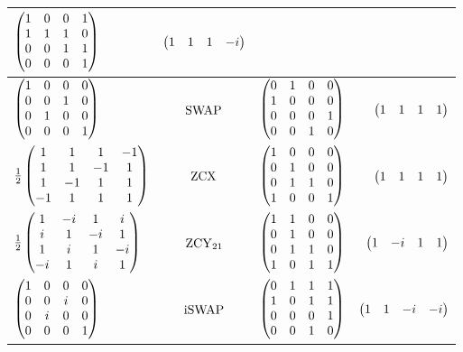 \documentclass[a4paper,english]{scrartcl}
\begin{document}
\begin{proposition}
\begin{table}[H]
\begin{tabular}{lccr}
  $\begin{pmatrix}1&0&0&1\\1&1&1&0\\0&0&1&1\\0&0&0&1\end{pmatrix}$ & $\begin{pmatrix}1&1&1&-i\end{pmatrix}$\\
  \midrule
  $\begin{pmatrix}1&0&0&0\\0&0&1&0\\0&1&0&0\\0&0&0&1\end{pmatrix}$ & $\Swap$ &
  $\begin{pmatrix}0&1&0&0\\1&0&0&0\\0&0&0&1\\0&0&1&0\end{pmatrix}$ & $\begin{pmatrix}1&1&1&1\end{pmatrix}$\\
  \midrule
  $\frac{1}{2}\begin{pmatrix}1&1&1&-1\\1&1&-1&1\\1&-1&1&1\\-1&1&1&1\end{pmatrix}$ & $\zcx$ &
  $\begin{pmatrix}1&0&0&0\\0&1&0&0\\0&1&1&0\\1&0&0&1\end{pmatrix}$ & $\begin{pmatrix}1&1&1&1\end{pmatrix}$\\
  \midrule
  $\frac{1}{2}\begin{pmatrix}1&-i&1&i\\i&1&-i&1\\1&i&1&-i\\-i&1&i&1\end{pmatrix}$ & $\zcy_{21}$ &
  $\begin{pmatrix}1&1&0&0\\0&1&0&0\\0&1&1&0\\1&0&1&1\end{pmatrix}$ & $\begin{pmatrix}1&-i&1&1\end{pmatrix}$\\
  \midrule
  $\begin{pmatrix}1&0&0&0\\0&0&i&0\\0&i&0&0\\0&0&0&1\end{pmatrix}$ & $\iSwap$ &
  $\begin{pmatrix}0&1&1&1\\1&0&1&1\\0&0&0&1\\0&0&1&0\end{pmatrix}$ & $\begin{pmatrix}1&1&-i&-i\end{pmatrix}$\\
  \bottomrule
\end{tabular}
\end{table}
\end{proposition}
\end{document}
